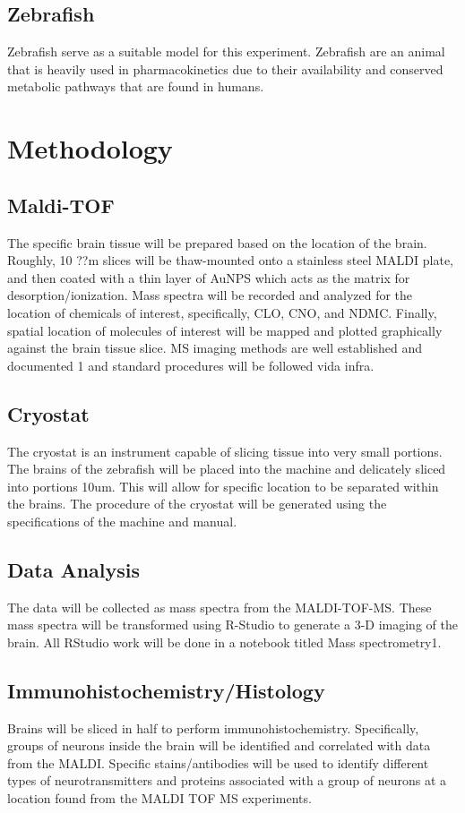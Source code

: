 \documentclass{article}\usepackage[]{graphicx}\usepackage[]{color}
\begin{document}
\subsection{Zebrafish}	
Zebrafish serve as a suitable model for this experiment. Zebrafish are an animal that is heavily used in pharmacokinetics due to their availability and conserved metabolic pathways that are found in humans\cite{villacrez2018evaluation}.
\section{Methodology}
\subsection{Maldi-TOF}
The specific brain tissue will be prepared based on the location of the brain. Roughly, 10 ??m slices will be thaw-mounted onto a stainless steel MALDI plate, and then coated with a thin layer of AuNPS which acts as the matrix for desorption/ionization. Mass spectra will be recorded and analyzed for the location of chemicals of interest, specifically, CLO, CNO, and NDMC. Finally, spatial location of molecules of interest will be mapped and plotted graphically against the brain tissue slice. MS imaging methods are well established and documented 1 and standard procedures will be followed vida infra.
\subsection{Cryostat}
The cryostat is an instrument capable of slicing tissue into very small portions. The brains of the zebrafish will be placed into the machine and delicately sliced into portions 10um. This will allow for specific location to be separated within the brains. The procedure of the cryostat will be generated using the specifications of the machine and manual.  
\subsection{Data Analysis}
The data will be collected as mass spectra from the MALDI-TOF-MS. These mass spectra will be transformed using R-Studio to generate a 3-D imaging of the brain. All RStudio work will be done in a notebook titled Mass spectrometry1. 
\subsection{Immunohistochemistry/Histology}
Brains will be sliced in half to perform immunohistochemistry. Specifically, groups of neurons inside the brain will be identified and correlated with data from the MALDI.  Specific stains/antibodies will be used to identify different types of neurotransmitters and proteins associated with a group of neurons at a location found from the MALDI TOF MS experiments.
\end{document}
